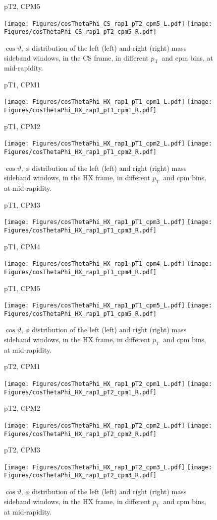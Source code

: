 \documentclass[12pt]{article}
\newcommand{\pt}{$p_{\mathrm{T}}$}
\begin{document}
\begin{figure}[htbp]
\centering
\caption{pT2, CPM5}
\texttt{[image: Figures/cosThetaPhi\_CS\_rap1\_pT2\_cpm5\_L.pdf]}
\texttt{[image: Figures/cosThetaPhi\_CS\_rap1\_pT2\_cpm5\_R.pdf]}
\caption{$\cos\vartheta,\,\phi$ distribution of the left (left) and
  right (right) mass sideband windows, in the CS frame, in different
  \pt\ and cpm bins, at mid-rapidity.}
\end{figure}
\clearpage



\begin{figure}[htbp]
\centering
\caption{pT1, CPM1}
\texttt{[image: Figures/cosThetaPhi\_HX\_rap1\_pT1\_cpm1\_L.pdf]}
\texttt{[image: Figures/cosThetaPhi\_HX\_rap1\_pT1\_cpm1\_R.pdf]}
\caption{pT1, CPM2}
\texttt{[image: Figures/cosThetaPhi\_HX\_rap1\_pT1\_cpm2\_L.pdf]}
\texttt{[image: Figures/cosThetaPhi\_HX\_rap1\_pT1\_cpm2\_R.pdf]}
\caption{$\cos\vartheta,\,\phi$ distribution of the left (left) and
  right (right) mass sideband windows, in the HX frame, in different
  \pt\ and cpm bins, at mid-rapidity.}
\end{figure}
\clearpage

\begin{figure}[htbp]
\centering
\caption{pT1, CPM3}
\texttt{[image: Figures/cosThetaPhi\_HX\_rap1\_pT1\_cpm3\_L.pdf]}
\texttt{[image: Figures/cosThetaPhi\_HX\_rap1\_pT1\_cpm3\_R.pdf]}
\caption{pT1, CPM4}
\texttt{[image: Figures/cosThetaPhi\_HX\_rap1\_pT1\_cpm4\_L.pdf]}
\texttt{[image: Figures/cosThetaPhi\_HX\_rap1\_pT1\_cpm4\_R.pdf]}
\caption{pT1, CPM5}
\texttt{[image: Figures/cosThetaPhi\_HX\_rap1\_pT1\_cpm5\_L.pdf]}
\texttt{[image: Figures/cosThetaPhi\_HX\_rap1\_pT1\_cpm5\_R.pdf]}
\caption{$\cos\vartheta,\,\phi$ distribution of the left (left) and
  right (right) mass sideband windows, in the HX frame, in different
  \pt\ and cpm bins, at mid-rapidity.}
\end{figure}
\clearpage

\begin{figure}[htbp]
\centering
\caption{pT2, CPM1}
\texttt{[image: Figures/cosThetaPhi\_HX\_rap1\_pT2\_cpm1\_L.pdf]}
\texttt{[image: Figures/cosThetaPhi\_HX\_rap1\_pT2\_cpm1\_R.pdf]}
\caption{pT2, CPM2}
\texttt{[image: Figures/cosThetaPhi\_HX\_rap1\_pT2\_cpm2\_L.pdf]}
\texttt{[image: Figures/cosThetaPhi\_HX\_rap1\_pT2\_cpm2\_R.pdf]}
\caption{pT2, CPM3}
\texttt{[image: Figures/cosThetaPhi\_HX\_rap1\_pT2\_cpm3\_L.pdf]}
\texttt{[image: Figures/cosThetaPhi\_HX\_rap1\_pT2\_cpm3\_R.pdf]}
\caption{$\cos\vartheta,\,\phi$ distribution of the left (left) and
  right (right) mass sideband windows, in the HX frame, in different
  \pt\ and cpm bins, at mid-rapidity.}
\end{figure}
\clearpage
\end{document}
